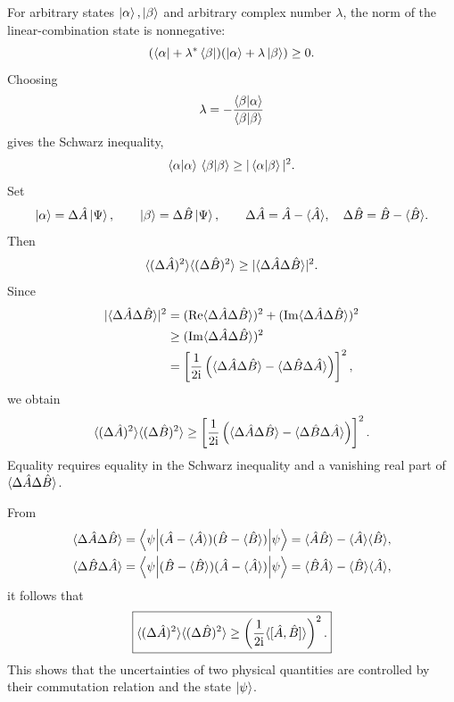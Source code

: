 For arbitrary states $\left|\alpha\right\rangle,\left|\beta\right\rangle$ and arbitrary complex number $\lambda$, the norm of the linear-combination state is nonnegative:
\begin{equation}
(\left\langle\alpha\right|+\lambda^*\left\langle\beta\right|)(\left|\alpha\right\rangle+\lambda\left|\beta\right\rangle)\ge0.
\end{equation}
Choosing
\begin{equation}
\lambda=-\frac{\left\langle\beta\middle|\alpha\right\rangle}{\left\langle\beta\middle|\beta\right\rangle}
\end{equation}
gives the Schwarz inequality,
\begin{equation}
\left\langle\alpha\middle|\alpha\right\rangle\,\left\langle\beta\middle|\beta\right\rangle\ge |\left\langle\alpha\middle|\beta\right\rangle|^2.
\end{equation}
Set
\begin{equation}
\left|\alpha\right\rangle=\Delta\hat{A}\left|\Psi\right\rangle,\qquad
\left|\beta\right\rangle=\Delta\hat{B}\left|\Psi\right\rangle,\qquad
\Delta\hat{A}=\hat{A}-\langle\hat{A}\rangle,\quad
\Delta\hat{B}=\hat{B}-\langle\hat{B}\rangle.
\end{equation}
Then
\begin{equation}
\langle(\Delta\hat{A})^2\rangle\langle(\Delta\hat{B})^2\rangle
\ge |\langle\Delta\hat{A}\Delta\hat{B}\rangle|^2.
\end{equation}
Since
\begin{equation}\begin{aligned}
|\langle\Delta\hat{A}\Delta\hat{B}\rangle|^2
&=(\operatorname{Re}\langle\Delta\hat{A}\Delta\hat{B}\rangle)^2
 +(\operatorname{Im}\langle\Delta\hat{A}\Delta\hat{B}\rangle)^2\\
&\ge(\operatorname{Im}\langle\Delta\hat{A}\Delta\hat{B}\rangle)^2\\
&=\left[\frac1{2\mathrm{i}}\left(\langle\Delta\hat{A}\Delta\hat{B}\rangle
-\langle\Delta\hat{B}\Delta\hat{A}\rangle\right)\right]^2,
\end{aligned}\end{equation}
we obtain
\begin{equation}
\langle(\Delta\hat{A})^2\rangle\langle(\Delta\hat{B})^2\rangle
\ge \left[\frac1{2\mathrm{i}}\left(\langle\Delta\hat{A}\Delta\hat{B}\rangle
-\langle\Delta\hat{B}\Delta\hat{A}\rangle\right)\right]^2.
\end{equation}
Equality requires equality in the Schwarz inequality and a vanishing real part of $\langle\Delta\hat{A}\Delta\hat{B}\rangle$.

From
\begin{equation}\begin{aligned}
\langle\Delta\hat{A}\Delta\hat{B}\rangle
&=\left\langle\psi\middle|(\hat{A}-\langle\hat{A}\rangle)(\hat{B}-\langle\hat{B}\rangle)\middle|\psi\right\rangle
=\langle\hat{A}\hat{B}\rangle-\langle\hat{A}\rangle\langle\hat{B}\rangle,\\
\langle\Delta\hat{B}\Delta\hat{A}\rangle
&=\left\langle\psi\middle|(\hat{B}-\langle\hat{B}\rangle)(\hat{A}-\langle\hat{A}\rangle)\middle|\psi\right\rangle
=\langle\hat{B}\hat{A}\rangle-\langle\hat{B}\rangle\langle\hat{A}\rangle,
\end{aligned}\end{equation}
it follows that
\begin{equation}
\boxed{\langle(\Delta\hat{A})^2\rangle\langle(\Delta\hat{B})^2\rangle
\ge \left(\frac1{2\mathrm{i}}\langle[\hat{A},\hat{B}]\rangle\right)^2.}
\end{equation}
This shows that the uncertainties of two physical quantities are controlled by their commutation relation and the state $\left|\psi\right\rangle$.